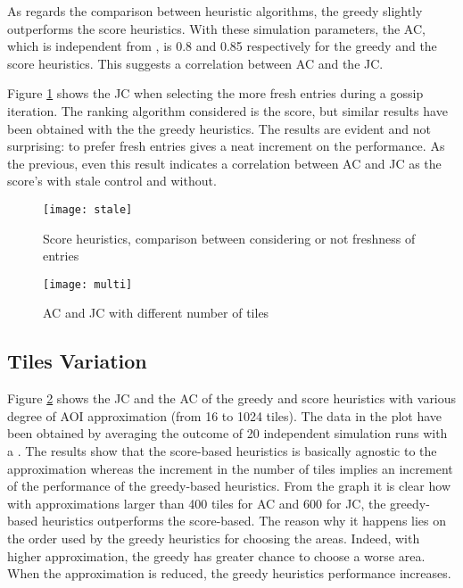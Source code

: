 \documentclass[final,10pt,a5paper]{phdimt}
\theoremstyle{definition}
\begin{document}
As regards the comparison between heuristic algorithms, the greedy slightly outperforms the score heuristics.
With these simulation parameters, the AC, which is independent from , is 0.8 and 0.85 respectively for the greedy and the score heuristics. This suggests a correlation between AC and the JC.


Figure \ref{graph:ts} shows the JC when selecting the more fresh entries during a gossip iteration. The ranking algorithm considered is the score, but similar results have been obtained with the the greedy heuristics. The results are evident and not surprising: to prefer fresh entries gives a neat increment on the performance. 
As the previous, even this result indicates a  correlation between AC and JC as the score's  with stale control and  without.

\begin{figure}[tbh]
\centering
\texttt{[image: stale]}
\caption{Score heuristics, comparison between considering or not freshness of entries}
\label{graph:ts}
\end{figure}





\begin{figure}[tbh]
\centering
\texttt{[image: multi]}
\caption{AC and JC with different number of tiles}
\label{graph:tiles}
\end{figure}


\subsection{Tiles Variation}

Figure \ref{graph:tiles} shows the JC and the AC of the greedy and score heuristics with various degree of AOI approximation (from 16 to 1024 tiles). The data in the plot have been obtained by averaging the outcome of 20 independent simulation runs with a .
The results show that the score-based heuristics is basically agnostic to the approximation whereas the increment in the number of tiles implies an increment of the performance of the greedy-based heuristics. From the graph it is clear how with approximations larger than 400 tiles for AC and 600 for JC, the greedy-based heuristics outperforms the score-based.
The reason why it happens lies on the order used by the greedy heuristics for choosing the areas. Indeed, with higher approximation, the greedy has greater chance to choose a worse area. When the approximation is reduced, the greedy heuristics performance increases.
\end{document}
